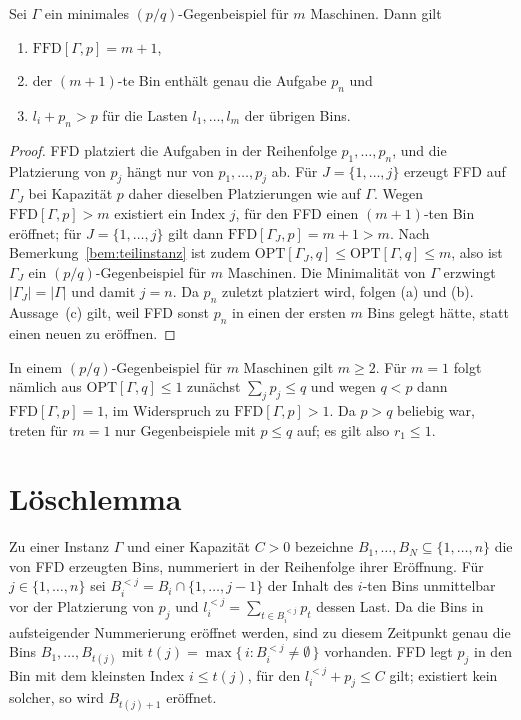 \begin{lemma}
\label{lem:gestalt}
Sei $\Gamma$ ein minimales $(p/q)$-Gegen\-bei\-spiel für $m$ Maschinen. Dann gilt
\begin{enumerate}[label=(\alph*), nosep]
  \item $\mathrm{FFD}[\Gamma, p] = m+1$,
  \item der $(m+1)$-te Bin enthält genau die Aufgabe $p_n$ und
  \item $l_i + p_n > p$ für die Lasten $l_1, \ldots, l_m$ der übrigen Bins.
\end{enumerate}
\end{lemma}

\begin{proof}
FFD platziert die Aufgaben in der Reihenfolge $p_1, \ldots, p_n$, und die Platzierung von $p_j$
hängt nur von $p_1, \ldots, p_j$ ab.
Für $J = \{1, \ldots, j\}$ erzeugt FFD auf $\Gamma_J$ bei Kapazität $p$ daher dieselben
Platzierungen wie auf $\Gamma$.
Wegen $\mathrm{FFD}[\Gamma, p] > m$ existiert ein Index $j$, für den FFD einen $(m+1)$-ten Bin
eröffnet; für $J = \{1, \ldots, j\}$ gilt dann $\mathrm{FFD}[\Gamma_J, p] = m+1 > m$.
Nach Bemerkung~\ref{bem:teilinstanz} ist zudem
$\mathrm{OPT}[\Gamma_J, q] \le \mathrm{OPT}[\Gamma, q] \le m$, also ist $\Gamma_J$ ein
$(p/q)$-Gegenbeispiel für $m$ Maschinen.
Die Minimalität von $\Gamma$ erzwingt $|\Gamma_J| = |\Gamma|$ und damit $j = n$.
Da $p_n$ zuletzt platziert wird, folgen (a) und (b).
Aussage~(c) gilt, weil FFD sonst $p_n$ in einen der ersten $m$ Bins gelegt hätte, statt einen
neuen zu eröffnen.
\end{proof}

\begin{bemerkung}[Maschinenzahl]
\label{bem:m-mindestens-zwei}
In einem $(p/q)$-Gegenbeispiel für $m$ Maschinen gilt $m \ge 2$.
Für $m = 1$ folgt nämlich aus $\mathrm{OPT}[\Gamma, q] \le 1$ zunächst $\sum_j p_j \le q$ und
wegen $q < p$ dann $\mathrm{FFD}[\Gamma, p] = 1$, im Widerspruch zu
$\mathrm{FFD}[\Gamma, p] > 1$.
Da $p > q$ beliebig war, treten für $m = 1$ nur Gegenbeispiele mit $p \le q$ auf; es gilt also
$r_1 \le 1$.
\end{bemerkung}

\section{Löschlemma}
\label{sec:loeschlemma}

Zu einer Instanz $\Gamma$ und einer Kapazität $C > 0$ bezeichne $B_1, \ldots, B_N \subseteq
\{1, \ldots, n\}$ die von FFD erzeugten Bins, nummeriert in der Reihenfolge ihrer Eröffnung.
Für $j \in \{1, \ldots, n\}$ sei $B_i^{<j} = B_i \cap \{1, \ldots, j-1\}$ der Inhalt des $i$-ten
Bins unmittelbar vor der Platzierung von $p_j$ und $l_i^{<j} = \sum_{t \in B_i^{<j}} p_t$ dessen
Last.
Da die Bins in aufsteigender Nummerierung eröffnet werden, sind zu diesem Zeitpunkt genau die
Bins $B_1, \ldots, B_{t(j)}$ mit $t(j) = \max\{\, i : B_i^{<j} \ne \emptyset \,\}$ vorhanden.
FFD legt $p_j$ in den Bin mit dem kleinsten Index $i \le t(j)$, für den $l_i^{<j} + p_j \le C$
gilt; existiert kein solcher, so wird $B_{t(j)+1}$ eröffnet.

